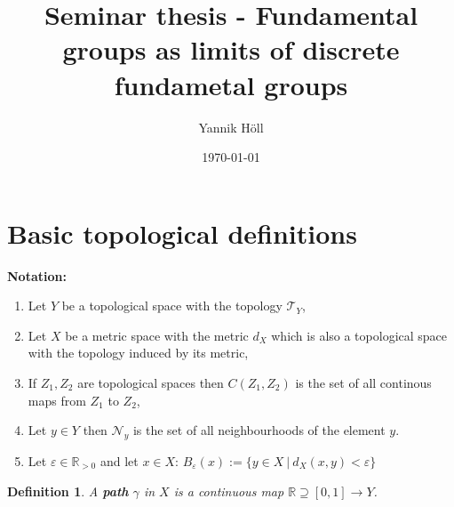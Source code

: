 \documentclass{article}
\title{Seminar thesis - Fundamental groups as limits of discrete fundametal groups}
\author{Yannik Höll}
\date{\today}
\newcommand{\R}[0]{\mathbb{R}}
\newcommand{\T}[0]{\mathcal{T}}
\newcommand{\NB}[0]{\mathcal{N}}
\theoremstyle{break}
\theoremstyle{break}
\newtheorem{defin}[thm]{Definition}
\begin{document}
\nocite{*}

\maketitle


\section{Basic topological definitions} \label{section-basic-defs}


\textbf{Notation:}
\begin{enumerate}
  \item Let $Y$ be a topological space with the topology $\T_Y$,
  \item Let $X$ be a metric space with the metric $d_X$ which is also a topological space with the topology induced by its metric,
  \item If $Z_1, Z_2$ are topological spaces then $C(Z_1, Z_2)$ is the set of all continous maps from $Z_1$ to $Z_2$,
  \item Let $y \in Y$ then $\NB_y$ is the set of all neighbourhoods of the element $y$.
  \item Let $\varepsilon \in \R_{>0}$ and let $x \in X$: $B_{\varepsilon}(x) := \{ y\in X \: | \: d_X(x, y) < \varepsilon\}$
\end{enumerate}

\begin{defin}
  A \textbf{path} $\gamma$ in $X$ is a continuous map $\R \supseteq [0,1] \to Y$.
\end{defin}
\end{document}
